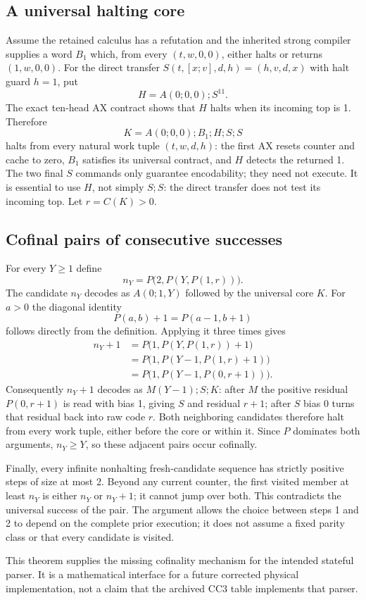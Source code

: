 \subsection{A universal halting core}
Assume the retained calculus has a refutation and the inherited strong
compiler supplies a word $B_1$ which, from every $(t,w,0,0)$, either halts
or returns $(1,w,0,0)$.  For the direct transfer
$S(t,[x;v],d,h)=(h,v,d,x)$ with halt guard $h=1$, put
\[
 H=A(0;0,0);S^{11}.
\]
The exact ten-head AX contract shows that $H$ halts when its incoming top is
1.  Therefore
\[
 K=A(0;0,0);B_1;H;S;S
\]
halts from every natural work tuple $(t,w,d,h)$: the first AX resets counter
and cache to zero, $B_1$ satisfies its universal contract, and $H$ detects
the returned 1.  The two final $S$ commands only guarantee encodability;
they need not execute.  It is essential to use $H$, not simply $S;S$:
the direct transfer does not test its incoming top.
Let $r=C(K)>0$.

\subsection{Cofinal pairs of consecutive successes}
For every $Y\ge1$ define
\[
 n_Y=P\bigl(2,P(Y,P(1,r))\bigr).
\]
The candidate $n_Y$ decodes as $A(0;1,Y)$ followed by the universal core $K$.
For $a>0$ the diagonal identity
\[
 P(a,b)+1=P(a-1,b+1)
\]
follows directly from the definition.  Applying it three times gives
\[
 \begin{split}
 n_Y+1
 &=P\bigl(1,P(Y,P(1,r))+1\bigr)\\
 &=P\bigl(1,P(Y-1,P(1,r)+1)\bigr)\\
 &=P\bigl(1,P(Y-1,P(0,r+1))\bigr).
 \end{split}
\]
Consequently $n_Y+1$ decodes as $M(Y-1);S;K$: after $M$ the positive
residual $P(0,r+1)$ is read with bias 1, giving $S$ and residual $r+1$;
after $S$ bias 0 turns that residual back into raw code $r$.
Both neighboring candidates therefore halt from every work tuple, either
before the core or within it.  Since $P$ dominates both arguments,
$n_Y\ge Y$, so these adjacent pairs occur cofinally.

Finally, every infinite nonhalting fresh-candidate sequence has strictly
positive steps of size at most 2.  Beyond any current counter, the first
visited member at least $n_Y$ is either $n_Y$ or $n_Y+1$; it cannot jump over
both.  This contradicts the universal success of the pair.  The argument
allows the choice between steps 1 and 2 to depend on the complete prior
execution; it does not assume a fixed parity class or that every candidate
is visited.

This theorem supplies the missing cofinality mechanism for the intended
stateful parser.  It is a mathematical interface for a future corrected
physical implementation, not a claim that the archived CC3 table implements
that parser.
